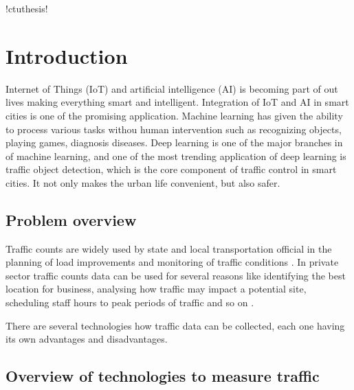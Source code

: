 \documentclass[twoside]{ctuthesis}
\theoremstyle{plain}
\theoremstyle{definition}
\theoremstyle{note}
\begin{document}
\renewcommand \ctulstsep {0pt}
\newcommand\ctuclsname{\leavevmode\unhcopy\ctuclsnamebox}
\newsavebox\ctuclsnamebox
\begin{lrbox}{\ctuclsnamebox}
\ctulst!ctuthesis!
\end{lrbox}
\maketitle
\chapter{Introduction}

Internet of Things (IoT) and artificial intelligence (AI) is becoming part of out lives making everything smart and intelligent. Integration of IoT and AI in smart cities is one of the promising application\cite{sushma_nagaraj}. 
Machine learning has given the ability to process various tasks withou human intervention such as recognizing objects, playing games, diagnosis diseases. Deep learning is one of the major branches in of machine learning, and one of the most trending application of deep learning is traffic object detection, which is the core component of traffic control in smart cities. It not only makes the urban life convenient, but also safer.


\section{Problem overview}

Traffic counts are widely used by state and local transportation official in the planning of load improvements and monitoring of traffic conditions \cite{traffic_counts}. In private sector traffic counts data can be used for several reasons like identifying the best location for business, analysing how traffic may impact a potential site, scheduling staff hours to peak periods of traffic and so on \cite{arcgis}.

 There are several technologies how traffic data can be collected, each one having its own advantages and disadvantages.

\section{Overview of technologies to measure traffic}
\end{document}
